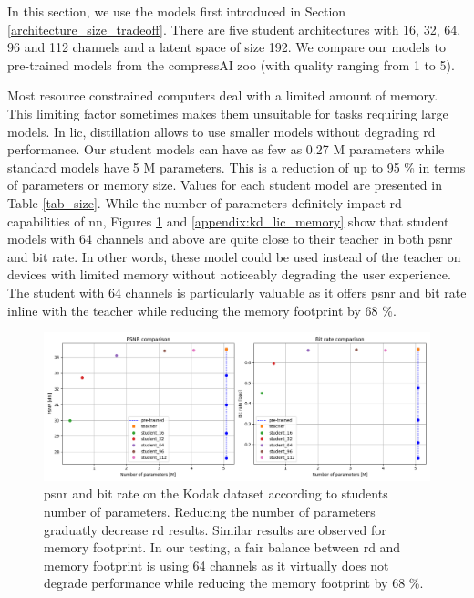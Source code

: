 \documentclass{article}
\begin{document}
In this section, we use the models first introduced in Section \ref{architecture_size_tradeoff}. There are five student architectures with 16, 32, 64, 96 and 112 channels and a latent space of size 192. We compare our models to pre-trained models from the compressAI zoo (with \textsf{quality} ranging from 1 to 5).

Most resource constrained computers deal with a limited amount of memory. This limiting factor sometimes makes them unsuitable for tasks requiring large models. In \acrshort{lic}, distillation allows to use smaller models without degrading \acrshort{rd} performance. Our student models can have as few as 0.27 M parameters while standard models have 5 M parameters. This is a reduction of up to 95 \% in terms of parameters or memory size. Values for each student model are presented in Table \ref{tab_size}. While the number of parameters definitely impact \acrshort{rd} capabilities of \acrshort{nn}, Figures \ref{kd_lic_parameters} and \ref{appendix:kd_lic_memory} show that student models with 64 channels and above are quite close to their teacher in both \acrshort{psnr} and bit rate. In other words, these model could be used instead of the teacher on devices with limited memory without noticeably degrading the user experience. The student with 64 channels is particularly valuable as it offers \acrshort{psnr} and bit rate inline with the teacher while reducing the memory footprint by 68 \%.

\begin{figure}
    \centering
    \includegraphics[width=15cm]{../img/kd_lic_parameters.png}
    \caption[\acrshort{psnr} and bit rate on the Kodak dataset according to students number of parameters.]{\acrshort{psnr} and bit rate on the Kodak dataset according to students number of parameters. Reducing the number of parameters graduatly decrease \acrshort{rd} results. Similar results are observed for memory footprint. In our testing, a fair balance between \acrshort{rd} and memory footprint is using 64 channels as it virtually does not degrade performance while reducing the memory footprint by 68 \%.}
    \label{kd_lic_parameters}
\end{figure}
\end{document}
